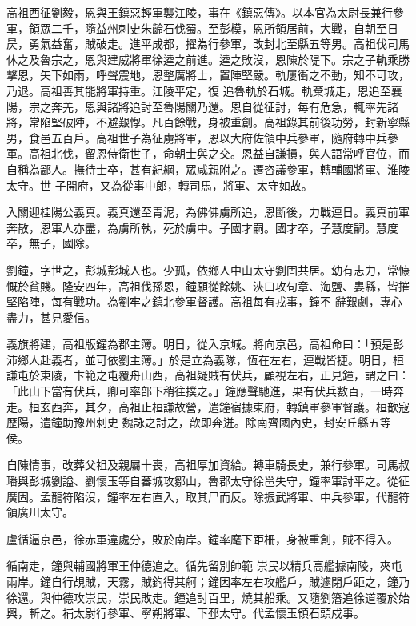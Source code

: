 \begin{pinyinscope}
 高祖西征劉毅，恩與王鎮惡輕軍襲江陵，事在《鎮惡傳》。以本官為太尉長兼行參軍，領眾二千，隨益州刺史朱齡石伐蜀。至彭模，恩所領居前，大戰，自朝至日昃，勇氣益奮，賊破走。進平成都，擢為行參軍，改封北至縣五等男。高祖伐司馬休之及魯宗之，恩與建威將軍徐逵之前進。逵之敗沒，恩陳於隄下。宗之子軌乘勝擊恩，矢下如雨，呼聲震地，恩整厲將士，置陣堅嚴。軌屢衝之不動，知不可攻，乃退。高祖善其能將軍持重。江陵平定，復
 追魯軌於石城。軌棄城走，恩追至襄陽，宗之奔羌，恩與諸將追討至魯陽關乃還。恩自從征討，每有危急，輒率先諸將，常陷堅破陣，不避艱惸。凡百餘戰，身被重創。高祖錄其前後功勞，封新寧縣男，食邑五百戶。高祖世子為征虜將軍，恩以大府佐領中兵參軍，隨府轉中兵參軍。高祖北伐，留恩侍衛世子，命朝士與之交。恩益自謙損，與人語常呼官位，而自稱為鄙人。撫待士卒，甚有紀綱，眾咸親附之。遷咨議參軍，轉輔國將軍、淮陵太守。世
 子開府，又為從事中郎，轉司馬，將軍、太守如故。



 入關迎桂陽公義真。義真還至青泥，為佛佛虜所追，恩斷後，力戰連日。義真前軍奔散，恩軍人亦盡，為虜所執，死於虜中。子國才嗣。國才卒，子慧度嗣。慧度卒，無子，國除。



 劉鐘，字世之，彭城彭城人也。少孤，依鄉人中山太守劉固共居。幼有志力，常慷慨於貧賤。隆安四年，高祖伐孫恩，鐘願從餘姚、浹口攻句章、海鹽、婁縣，皆摧堅陷陣，每有戰功。為劉牢之鎮北參軍督護。高祖每有戎事，鐘不
 辭艱劇，專心盡力，甚見愛信。



 義旗將建，高祖版鐘為郡主簿。明日，從入京城。將向京邑，高祖命曰：「預是彭沛鄉人赴義者，並可依劉主簿。」於是立為義隊，恆在左右，連戰皆捷。明日，桓謙屯於東陵，卞範之屯覆舟山西，高祖疑賊有伏兵，顧視左右，正見鐘，謂之曰：「此山下當有伏兵，卿可率部下稍往撲之。」鐘應聲馳進，果有伏兵數百，一時奔走。桓玄西奔，其夕，高祖止桓謙故營，遣鐘宿據東府，轉鎮軍參軍督護。桓歆寇歷陽，遣鐘助豫州刺史
 魏詠之討之，歆即奔迸。除南齊國內史，封安丘縣五等侯。



 自陳情事，改葬父祖及親屬十喪，高祖厚加資給。轉車騎長史，兼行參軍。司馬叔璠與彭城劉謚、劉懷玉等自蕃城攻鄒山，魯郡太守徐邕失守，鐘率軍討平之。從征廣固。孟龍符陷沒，鐘率左右直入，取其尸而反。除振武將軍、中兵參軍，代龍符領廣川太守。



 盧循逼京邑，徐赤軍違處分，敗於南岸。鐘率麾下距柵，身被重創，賊不得入。



 循南走，鐘與輔國將軍王仲德追之。循先留別帥範
 崇民以精兵高艦據南陵，夾屯兩岸。鐘自行覘賊，天霧，賊鉤得其舸；鐘因率左右攻艦戶，賊遽閉戶距之，鐘乃徐還。與仲德攻崇民，崇民敗走。鐘追討百里，燒其船乘。又隨劉籓追徐道覆於始興，斬之。補太尉行參軍、寧朔將軍、下邳太守。代孟懷玉領石頭戍事。




\end{pinyinscope}
